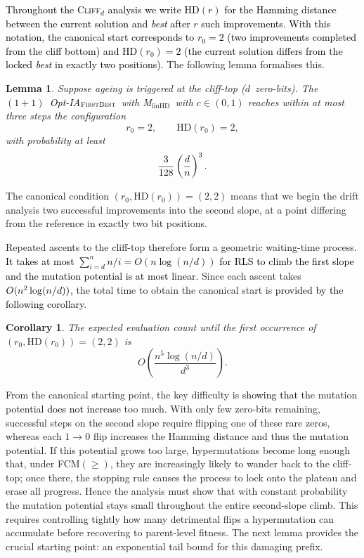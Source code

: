 \documentclass[lettersize,journal]{IEEEtran}
\newcommand{\new}[1]{\textcolor{black}{#1}}
\newcommand{\rev}[1]{\textcolor{black}{#1}}
\newcommand{\rerev}[1]{\textcolor{black}{#1}}
\newcommand{\cliff}{\textsc{Cliff}$_d$}
\newcommand{\linHD}{M$_{\text{linHD}}$}
\newcommand{\firstBest}{$(1+1)$~Opt-IA$_{\textsc{FirstBest}}$}
\newtheorem{corollary}{Corollary}
\newtheorem{lemma}{Lemma}
\begin{document}
{\textcolor{black}{Throughout the \cliff{} analysis we write $\mathrm{HD}(r)$ for
the Hamming distance between the current solution and \emph{best} after $r$
such improvements.
With this notation, the canonical start corresponds to
$r_0 = 2$ (two improvements completed from the cliff bottom)
and $\mathrm{HD}(r_0) = 2$ (the current solution differs from the locked
\emph{best} in exactly two positions).}  The following lemma formalises this.

\begin{lemma}\label{lem:can-start-omega-d3}
	Suppose ageing is triggered at the cliff-top ($d$~zero-bits).  
	The \rev{\firstBest}~with \linHD\ with $c\in(0,1)$ reaches within at most three steps the 
	configuration
	\[
	r_0=2, \qquad \mathrm{HD}(r_0)=2,
	\]
	with probability at least 
	\[
	\rerev{\frac{3}{128}}\left(\frac{d}{n}\right)^3.
	\]
\end{lemma}


The canonical condition $(r_0,\mathrm{HD}(r_0)) =
(2,2)$ means that we begin the drift analysis two successful improvements into
the second slope, at a point differing from the reference in exactly two
bit positions.

Repeated ascents to the cliff-top therefore form a geometric waiting-time 
process.   \rev{It takes at most $\sum_{i=d}^{n}n/i=O(n\log(n/d))$ for RLS to climb the first slope and the mutation potential is at most linear.
} Since each ascent takes $\rev{O}(n^2\log(n/d))$, the 
total time to obtain the canonical start is \new{provided by the following corollary}.

\begin{corollary}
The expected evaluation count until the first occurrence of 
	$(r_0,\mathrm{HD}(r_0)) = (2,2)$ is 
	\[
	O\!\left(\frac{n^{5}\log(n/d)}{d^{3}}\right).
	\]
\end{corollary}


From the canonical starting point, the key difficulty is \new{showing that} the mutation
potential \new{does not increase} too much.  With only few zero-bits remaining, successful
steps on the second slope require flipping one of these rare zeros, whereas each
$1\!\to0$ flip increases the Hamming distance and thus the mutation potential.
If this potential grows too large, hypermutations become long enough that, under
FCM$(\ge)$, they are increasingly likely to wander back to the cliff-top; once
there, the stopping rule causes the process to lock onto the plateau and erase
all progress.  Hence the analysis must show that with constant probability the
mutation potential stays small throughout the entire second-slope climb.  This
requires  controlling tightly how many detrimental flips a hypermutation can
accumulate before recovering to parent-level fitness.  The next lemma provides
the crucial starting point: an exponential tail bound for this damaging prefix.

}
\end{document}
